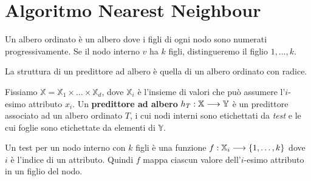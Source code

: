 \documentclass[\main/main.tex]{subfiles}
\begin{document}
\chapter{Algoritmo Nearest Neighbour}
\begin{multicols}{2}
\begin{definition}
    Un albero ordinato è un albero dove i figli di ogni nodo sono numerati progressivamente. Se il nodo interno \(v\) ha \(k\) figli, distingueremo il figlio \(1, \ldots, k\).
\end{definition}
\begin{definition}
    La struttura di un predittore ad albero è quella di un albero ordinato con radice. 
\end{definition}
\begin{definition}
    Fissiamo \(\mathbb{X} = \mathbb{X}_1 \times \ldots \times \mathbb{X}_d\), dove \(\mathbb{X}_i\) è l'insieme di valori che può assumere l'\(i\)-esimo attributo \(x_i\). Un \textbf{predittore ad albero} \(h_T:\mathbb{X}\longrightarrow \mathbb{Y}\) è un predittore associato ad un albero ordinato \(T\), i cui nodi interni sono etichettati da \textit{test} e le cui foglie sono etichettate da elementi di \(\mathbb{Y}\).
    
    Un test per un nodo interno con \(k\) figli è una funzione \(f:\mathbb{X}_i\longrightarrow \left\{1, \ldots, k\right\}\) dove \(i\) è l'indice di un attributo. Quindi \(f\) mappa ciascun valore dell'\(i\)-esimo attributo in un figlio del nodo.
    

\end{definition}
\end{multicols}
\end{document}
